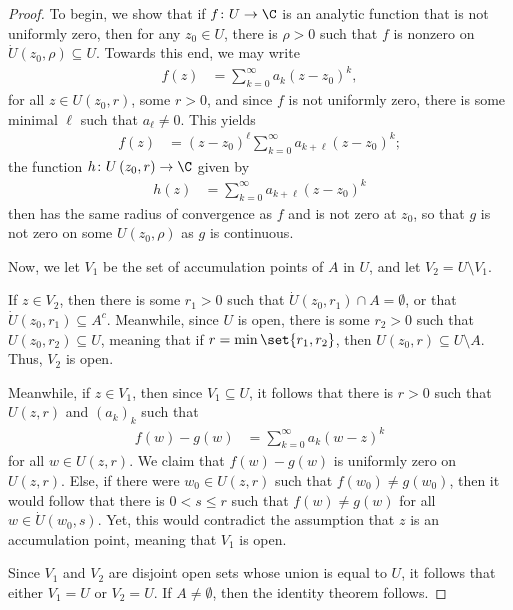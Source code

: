 \documentclass[10pt]{mypackage}
\begin{document}
\begin{proof}
  To begin, we show that if $f\colon U\rightarrow \C$ is an analytic function that is not uniformly zero, then for any $z_0\in U$, there is $\rho > 0$ such that $f$ is nonzero on $\dot{U}\left( z_0,\rho \right)\subseteq U$. Towards this end, we may write
  \begin{align*}
    f(z) &= \sum_{k=0}^{\infty}a_k\left( z-z_0 \right)^{k},
  \end{align*}
  for all $z\in U\left( z_0,r \right)$, some $r > 0$, and since $f$ is not uniformly zero, there is some minimal $\ell$ such that $a_{\ell}\neq 0$. This yields
  \begin{align*}
    f(z) &= \left( z-z_0 \right)^{\ell}\sum_{k=0}^{\infty}a_{k + \ell}\left( z-z_0 \right)^{k};
  \end{align*}
  the function $h\colon U\left( z_0,r \right)\rightarrow \C$ given by
  \begin{align*}
    h(z) &= \sum_{k=0}^{\infty}a_{k + \ell}\left( z-z_0 \right)^{k}
  \end{align*}
  then has the same radius of convergence as $f$ and is not zero at $z_0$, so that $g$ is not zero on some $U\left( z_0,\rho \right)$ as $g$ is continuous.\newline

  Now, we let $V_1$ be the set of accumulation points of $A$ in $U$, and let $V_2 = U\setminus V_1$.\newline

  If $z\in V_2$, then there is some $r_1 > 0$ such that $\dot{U}\left( z_0,r_1 \right)\cap A = \emptyset$, or that $\dot{U}\left( z_0,r_1 \right) \subseteq A^{c}$. Meanwhile, since $U$ is open, there is some $r_2 > 0$ such that $U\left( z_0,r_2 \right)\subseteq U$, meaning that if $r = \min\set{r_1,r_2}$, then $U\left( z_0,r \right) \subseteq U\setminus A$. Thus, $V_2$ is open.\newline

  Meanwhile, if $z\in V_1$, then since $V_1\subseteq U$, it follows that there is $r > 0$ such that $U\left( z,r \right)$ and $\left( a_k \right)_k$ such that
  \begin{align*}
    f(w)- g(w) &= \sum_{k=0}^{\infty}a_k\left( w-z \right)^{k}
  \end{align*}
  for all $w\in U\left( z,r \right)$. We claim that $f(w) - g(w)$ is uniformly zero on $U\left( z,r \right)$. Else, if there were $w_0\in U\left( z,r \right)$ such that $f\left( w_0 \right)\neq g\left( w_0 \right)$, then it would follow that there is $0 < s\leq r$ such that $f(w)\neq g(w)$ for all $w\in \dot{U}\left( w_0,s \right)$. Yet, this would contradict the assumption that $z$ is an accumulation point, meaning that $V_1$ is open.\newline

  Since $V_1$ and $V_2$ are disjoint open sets whose union is equal to $U$, it follows that either $V_1 = U$ or $V_2 = U$. If $A \neq \emptyset$, then the identity theorem follows.
\end{proof}
\end{document}
